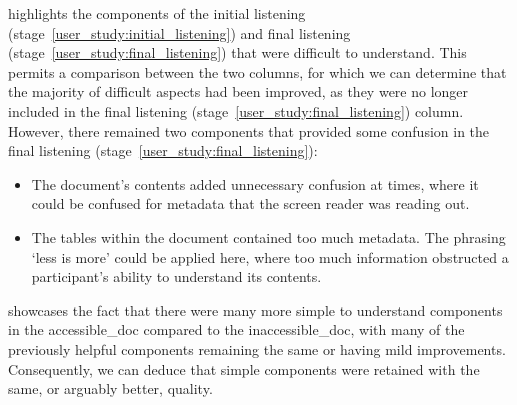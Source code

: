  highlights the components of the initial listening (stage~\ref{user_study:initial_listening}) and final listening (stage~\ref{user_study:final_listening}) that were difficult to understand. This permits a comparison between the two columns, for which we can determine that the majority of difficult aspects had been improved, as they were no longer included in the final listening (stage~\ref{user_study:final_listening}) column. However, there remained two components that provided some confusion in the final listening (stage~\ref{user_study:final_listening}):
\begin{itemize}
    \item The document's contents added unnecessary confusion at times, where it could be confused for \gls{metadata} that the screen reader was reading out.
    \item The tables within the document contained too much \gls{metadata}. The phrasing `less is more' could be applied here, where too much information obstructed a participant's ability to understand its contents.
\end{itemize}

 showcases the fact that there were many more simple to understand components in the \gls{accessible_doc} compared to the \gls{inaccessible_doc}, with many of the previously helpful components remaining the same or having mild improvements. Consequently, we can deduce that simple components were retained with the same, or arguably better, quality. 

